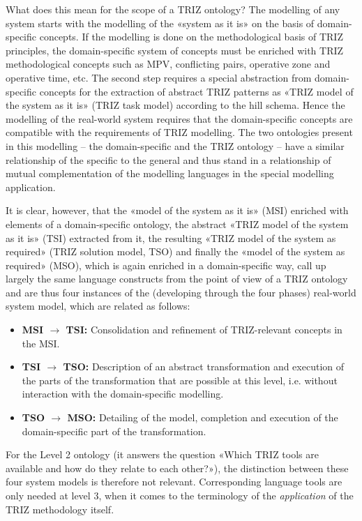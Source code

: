 \documentclass[11pt,a4paper]{article}
\begin{document}
What does this mean for the scope of a TRIZ ontology? The modelling of any
system starts with the modelling of the «system as it is» on the basis of
domain-specific concepts. If the modelling is done on the methodological basis
of TRIZ principles, the domain-specific system of concepts must be enriched
with TRIZ methodological concepts such as MPV, conflicting pairs, operative
zone and operative time, etc.  The second step requires a special abstraction
from domain-specific concepts for the extraction of abstract TRIZ patterns as
«TRIZ model of the system as it is» (TRIZ task model) according to the hill
schema.  Hence the modelling of the real-world system requires that the
domain-specific concepts are compatible with the requirements of TRIZ
modelling.  The two ontologies present in this modelling -- the
domain-specific and the TRIZ ontology -- have a similar relationship of the
specific to the general and thus stand in a relationship of mutual
complementation of the modelling languages in the special modelling
application.

It is clear, however, that the «model of the system as it is» (MSI) enriched
with elements of a domain-specific ontology, the abstract «TRIZ model of the
system as it is» (TSI) extracted from it, the resulting «TRIZ model of the
system as required» (TRIZ solution model, TSO) and finally the «model of the
system as required» (MSO), which is again enriched in a domain-specific way,
call up largely the same language constructs from the point of view of a TRIZ
ontology and are thus four instances of the (developing through the four
phases) real-world system model, which are related as follows:
\begin{itemize}[noitemsep]
\item \textbf{MSI $\to$ TSI:} Consolidation and refinement of TRIZ-relevant
  concepts in the MSI.
\item \textbf{TSI $\to$ TSO:} Description of an abstract transformation and
  execution of the parts of the transformation that are possible at this
  level, i.e. without interaction with the domain-specific modelling.
\item \textbf{TSO $\to$ MSO:} Detailing of the model, completion and execution
  of the domain-specific part of the transformation.
\end{itemize}
For the Level 2 ontology (it answers the question «Which TRIZ tools are
available and how do they relate to each other?»), the distinction between
these four system models is therefore not relevant. Corresponding language
tools are only needed at level 3, when it comes to the terminology of the
\emph{application} of the TRIZ methodology itself.
\end{document}
